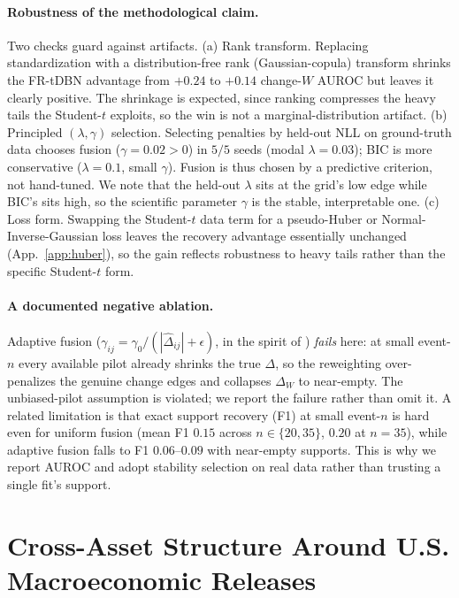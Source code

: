 \documentclass{article}
\newcommand{\Wd}{\Delta_{\!W}}
\begin{document}
\paragraph{Robustness of the methodological claim.}
Two checks guard against artifacts. (a) Rank transform. Replacing
standardization with a distribution-free rank (Gaussian-copula) transform shrinks the
FR-tDBN advantage from $+0.24$ to $+0.14$ change-$W$ AUROC but leaves it clearly
positive. The shrinkage is expected, since ranking compresses the heavy tails the
Student-$t$ exploits, so the win is not a marginal-distribution artifact.
(b) Principled $(\lambda,\gamma)$ selection. Selecting penalties by held-out
NLL on ground-truth data chooses fusion ($\gamma{=}0.02>0$) in $5/5$ seeds (modal
$\lambda{=}0.03$); BIC is more conservative ($\lambda{=}0.1$, small $\gamma$). Fusion
is thus chosen by a predictive criterion, not hand-tuned. We note that the
held-out $\lambda$ sits at the grid's low edge while BIC's sits high, so the scientific
parameter $\gamma$ is the stable, interpretable one. (c) Loss form. Swapping the
Student-$t$ data term for a pseudo-Huber or Normal-Inverse-Gaussian loss leaves the
recovery advantage essentially unchanged (App.~\ref{app:huber}), so the gain reflects
robustness to heavy tails rather than the specific Student-$t$ form.

\paragraph{A documented negative ablation.}
Adaptive fusion ($\gamma_{ij}=\gamma_0/(|\hat\Delta_{ij}|+\epsilon)$, in the spirit of
\citealp{zou2006adaptive,candes2008reweighted}) \emph{fails} here: at small event-$n$
every available pilot already shrinks the true $\Delta$, so the reweighting
over-penalizes the genuine change edges and collapses $\Wd$ to near-empty. The
unbiased-pilot assumption is violated; we report the failure rather than omit it.
A related limitation is that exact support recovery (F1) at small event-$n$ is
hard even for uniform fusion (mean F1 $0.15$ across $n\in\{20,35\}$, $0.20$ at
$n=35$), while adaptive fusion falls to F1 $0.06$--$0.09$ with near-empty supports.
This is why we report AUROC and adopt stability selection on real data rather than
trusting a single fit's support.

\section{Cross-Asset Structure Around U.S. Macroeconomic Releases}
\label{sec:application}
\end{document}
